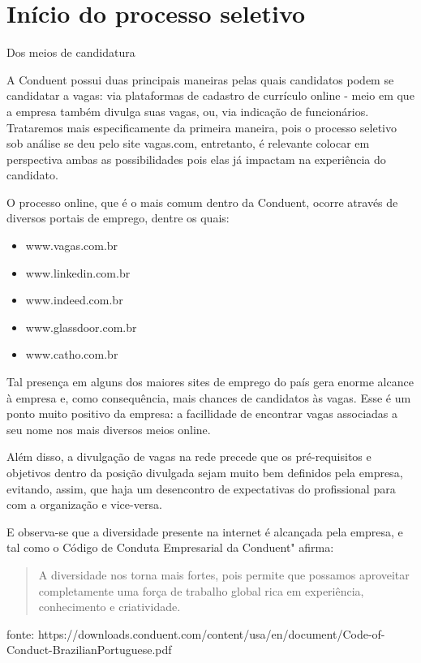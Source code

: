 \documentclass[12pt]{article}
\begin{document}
\part  {Início do processo seletivo}


Dos meios de candidatura

A Conduent possui duas principais maneiras pelas quais candidatos podem se candidatar a vagas: via plataformas de cadastro de currículo online - meio em que a empresa também divulga suas vagas, ou, via indicação de funcionários. Trataremos mais especificamente da primeira maneira, pois o processo seletivo sob análise se deu pelo site vagas.com, entretanto, é relevante colocar em perspectiva ambas as possibilidades pois elas já impactam na experiência do candidato. 

O processo online, que é o mais comum dentro da Conduent, ocorre através de diversos portais de emprego, dentre os quais:

\begin{itemize}
\item www.vagas.com.br
\item www.linkedin.com.br
\item www.indeed.com.br
\item  www.glassdoor.com.br
\item  www.catho.com.br
\end{itemize} 

Tal presença em alguns dos maiores sites de emprego do país gera enorme alcance à empresa e, como consequência, mais chances de candidatos às vagas. Esse é um ponto muito positivo da empresa: a facillidade de encontrar vagas associadas a seu nome nos mais diversos meios online.

Além disso, a divulgação de vagas na rede precede que os pré-requisitos e objetivos dentro da posição divulgada sejam muito bem definidos pela empresa, evitando, assim, que haja um desencontro de expectativas do profissional para com a organização e vice-versa. 

E observa-se que a diversidade  presente na internet é alcançada pela empresa, e tal como o Código de Conduta Empresarial da Conduent" afirma: 

\begin{quote}
A diversidade nos torna mais fortes, pois permite que possamos aproveitar completamente uma força de trabalho global rica em experiência, conhecimento e criatividade.
\end{quote}

 fonte:  https://downloads.conduent.com/content/usa/en/document/Code-of-Conduct-BrazilianPortuguese.pdf
\end{document}

